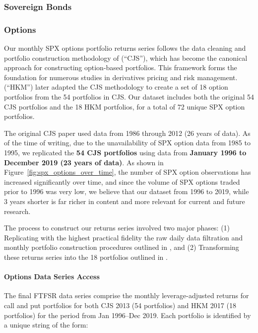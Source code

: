 \documentclass{article}
\begin{document}
\begin{appendices}
\subsubsection{Sovereign Bonds}
\label{sec:sovereign}

\subsubsection{Options}
\label{sec:options}

Our monthly SPX options portfolio returns series follows the data cleaning and portfolio construction methodology of \citet{Constantinides2013} (``CJS''), which has become the canonical approach for constructing option-based portfolios. This framework forms the foundation for numerous studies in derivatives pricing and risk management. \citet{He2017} (``HKM'') later adapted the CJS methodology to create a set of 18 option portfolios from the 54 portfolios in CJS. Our dataset includes both the original 54 CJS portfolios and the 18 HKM portfolios, for a total of 72 unique SPX option portfolios.

The original CJS paper used data from 1986 through 2012 (26 years of data). As of the time of writing, due to the unavailability of SPX option data from 1985 to 1995, we replicated the \textbf{54 CJS portfolios} using data from \textbf{January 1996 to December 2019 (23 years of data)}. As shown in Figure~\ref{fig:spx_options_over_time}, the number of SPX option observations has increased significantly over time, and since the volume of SPX options traded prior to 1996 was very low, we believe that our dataset from 1996 to 2019, while 3 years shorter is far richer in content and more relevant for current and future research.

The process to construct our returns series involved two major phases: (1) Replicating with the highest practical fidelity the raw daily data filtration and monthly portfolio construction procedures outlined in \citet{Constantinides2013}, and (2) Transforming these returns series into the 18 portfolios outlined in \citet{He2017}.

\paragraph{Options Data Series Access}

The final FTFSR data series comprise the monthly leverage-adjusted returns for call and put portfolios for both CJS 2013 (54 portfolios) and HKM 2017 (18 portfolios) for the period from Jan 1996--Dec 2019. Each portfolio is identified by a unique string of the form: 


\end{appendices}
\end{document}
